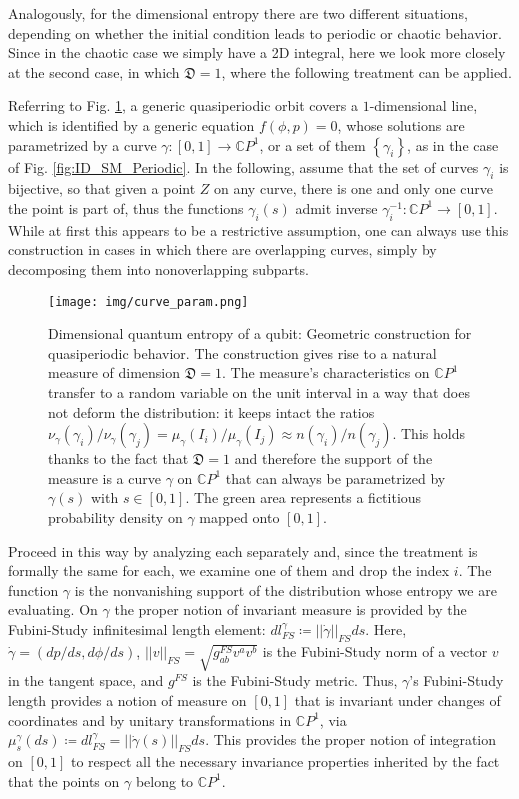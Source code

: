 \documentclass[draft,nofootinbib,pre,twocolumn,showkeys,superscriptaddress,preprintnumbers,floatfix]{revtex4-1}
\newcommand{\1}{\mathbbm{1}}
\newcommand{\DD}{\mathfrak{D}}
\begin{document}
Analogously, for the dimensional entropy there are two different situations,
depending on whether the initial condition leads to periodic or chaotic
behavior. Since in the chaotic case we simply have a 2D integral, here we
look more closely at the second case, in which $\DD=1$, where the following
treatment can be applied.

Referring to Fig. \ref{fig:DQE}, a generic quasiperiodic orbit covers a
$1$-dimensional line, which is identified by a generic equation $f(\phi,p)=0$,
whose solutions are parametrized by a curve $\gamma : [0,1] \to \mathbb{C}P^1$,
or a set of them $\left\{ \gamma_i\right\}$, as in the case of Fig.
\ref{fig:ID_SM_Periodic}. In the following, assume that the set of curves
$\gamma_i$ is bijective, so that given a point $Z$ on any curve, there is one
and only one curve the point is part of, thus the functions $\gamma_i(s)$ admit
inverse $\gamma_i^{-1}: \mathbb{C}P^1 \to [0,1]$. While at first this appears
to be a restrictive assumption, one can always use this construction in cases in
which there are overlapping curves, simply by decomposing them into
nonoverlapping subparts.

\begin{figure}
\texttt{[image: img/curve\_param.png]}
\caption{Dimensional quantum entropy of a qubit: Geometric construction for
	quasiperiodic behavior. The construction gives rise to a natural measure of
	dimension $\mathfrak{D}=1$. The measure's characteristics on
	$\mathbb{C}P^1$ transfer to a random variable on the unit interval in a way
	that does not deform the distribution: it keeps intact the
	ratios $\nu_\gamma(\gamma_i) / \nu_\gamma(\gamma_j) =
	\mu_\gamma(I_i) / \mu_\gamma(I_j) \approx
	n(\gamma_i) / n(\gamma_j)$. This holds thanks to the fact that
	$\mathfrak{D}=1$ and therefore the support of the measure is a curve
	$\gamma$ on $\mathbb{C}P^1$ that can always be parametrized by
	$\gamma(s)$ with $s\in[0,1]$. The green area represents a fictitious
	probability density on $\gamma$ mapped onto $[0,1]$.
	}
\label{fig:DQE} 
\end{figure}

Proceed in this way by analyzing each separately and, since the treatment is
formally the same for each, we examine one of them and drop the index $i$.  The
function $\gamma$ is the nonvanishing support of the distribution whose entropy
we are evaluating. On $\gamma$ the proper notion of invariant measure is
provided by the Fubini-Study infinitesimal length element:
$dl_{FS}^{\gamma}\coloneqq ||\dot{\gamma}||_{FS} ds$. Here, $\dot{\gamma} =
(dp/ds,d\phi/ds)$, $|| v ||_{FS} = \sqrt{g_{ab}^{FS}v^a v^b}$ is the
Fubini-Study norm of a vector $v$ in the tangent space, and $g^{FS}$ is the
Fubini-Study metric. Thus, $\gamma$'s Fubini-Study length provides a notion of
measure on $[0,1]$ that is invariant under changes of coordinates and by
unitary transformations in $\mathbb{C}P^1$, via $\mu^\gamma_s(ds) \coloneqq
dl^\gamma_{FS}= ||\dot{\gamma}(s)||_{FS}ds$. This provides the proper notion of
integration on $[0,1]$ to respect all the necessary invariance properties
inherited by the fact that the points on $\gamma$ belong to $\mathbb{C}P^1$.
\end{document}
